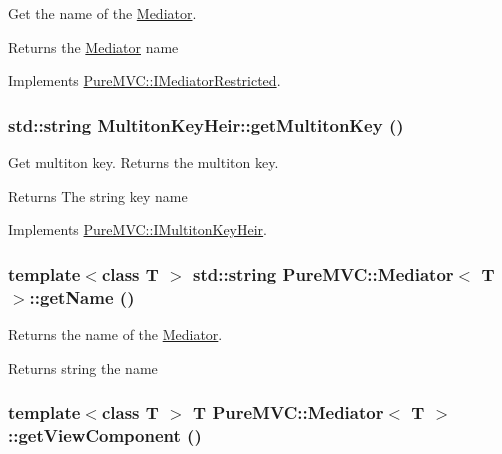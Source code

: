 Get the name of the {\ttfamily \hyperlink{class_pure_m_v_c_1_1_mediator}{Mediator}}. \begin{DoxyReturn}{Returns}
the \hyperlink{class_pure_m_v_c_1_1_mediator}{Mediator} name 
\end{DoxyReturn}


Implements \hyperlink{class_pure_m_v_c_1_1_i_mediator_restricted_a763c71cd6446cb09c2eb55ad91ca28ca}{PureMVC::IMediatorRestricted}.\hypertarget{class_pure_m_v_c_1_1_multiton_key_heir_aa5622459d33380deb08dc3cab8b991c7}{
\subsubsection[{getMultitonKey}]{\setlength{\rightskip}{0pt plus 5cm}std::string MultitonKeyHeir::getMultitonKey ()}}
\label{class_pure_m_v_c_1_1_multiton_key_heir_aa5622459d33380deb08dc3cab8b991c7}


Get multiton key. Returns the multiton key. \begin{DoxyReturn}{Returns}
The string key name 
\end{DoxyReturn}


Implements \hyperlink{class_pure_m_v_c_1_1_i_multiton_key_heir_aecccfb9898368c6377550ceae5730934}{PureMVC::IMultitonKeyHeir}.\hypertarget{class_pure_m_v_c_1_1_mediator_afefe595d1283eb6ae844263d1c95787c}{
\subsubsection[{getName}]{\setlength{\rightskip}{0pt plus 5cm}template$<$class T $>$ std::string {\bf PureMVC::Mediator}$<$ T $>$::getName ()}}
\label{class_pure_m_v_c_1_1_mediator_afefe595d1283eb6ae844263d1c95787c}


Returns the name of the \hyperlink{class_pure_m_v_c_1_1_mediator}{Mediator}. \begin{DoxyReturn}{Returns}
string the name 
\end{DoxyReturn}
\hypertarget{class_pure_m_v_c_1_1_mediator_aadd3a8ea554fb01f8fcac30592ef0275}{
\subsubsection[{getViewComponent}]{\setlength{\rightskip}{0pt plus 5cm}template$<$class T $>$ T {\bf PureMVC::Mediator}$<$ T $>$::getViewComponent ()}}
\label{class_pure_m_v_c_1_1_mediator_aadd3a8ea554fb01f8fcac30592ef0275}



